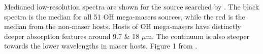 \label{fig:oh_ir_spectra} Medianed low-resolution spectra are shown for the source searched by \citet{willett2011_II}. The black spectra is the median for all 51 OH mega-masers sources, while the red is the median from the non-maser hosts. Hosts of OH mega-masers have distinctly deeper absorption features around 9.7 \& 18 $\mu$m. The continuum is also steeper towards the lower wavelengths in maser hosts. Figure 1 from \citet{willett2011_II}.